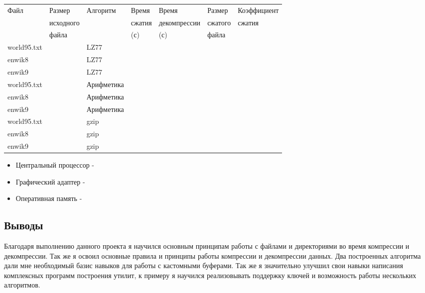 \documentclass[12pt]{article}
\begin{document}
\noindent
\begin{tabular}{| l | l | l | l | l | l | l |}
	\hline
	Файл             & Размер 	 & Алгоритм & Время  & Время        & Размер  & Коэффициент \\
	& исходного &          & сжатия & декомпрессии & сжатого & сжатия      \\
	& файла     &          & (с)    & (с)          & файла   &	   		    \\
	\hline
	world95.txt      & & LZ77       & & & &\\
	\hline
	enwik8           & & LZ77       & & & &\\
	\hline
	enwik9           & & LZ77       & & & &\\
	\hline
	world95.txt      & & Арифметика & & & &\\
	\hline
	enwik8           & & Арифметика & & & &\\
	\hline
	enwik9           & & Арифметика & & & &\\
	\hline
	world95.txt      & & gzip       & & & &\\
	\hline
	enwik8           & & gzip       & & & &\\
	\hline
	enwik9           & & gzip       & & & &\\
	\hline
	
	
\end{tabular}


\begin{itemize}
	\item Центральный процессор - 
	\item Графический адаптер - 
	\item Оперативная память - 
\end{itemize}

\subsection*{Выводы}

Благодаря выполнению данного проекта я научился основным принципам работы с файлами и директориями во время компрессии и декомпрессии. Так же я освоил основные правила и принципы работы компрессии и декомпрессии данных. Два построенных алгоритма дали мне необходимый базис навыков для работы с кастомными буферами. Так же я значительно улучшил свои навыки написания комплексных программ построения утилит, к примеру я научился реализовывать поддержку ключей и возможность работы нескольких алгоритмов.
\end{document}
